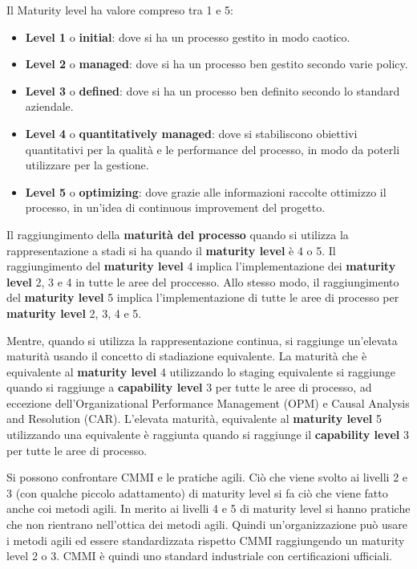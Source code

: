 \begin{enumerate}
            Il Maturity level ha valore compreso tra 1 e 5:
            \begin{itemize}
                  \item \textbf{Level 1} o \textbf{initial}: dove si ha un processo
                        gestito in modo caotico.
                  \item \textbf{Level 2} o \textbf{managed}: dove si ha un processo
                        ben gestito secondo varie policy.
                  \item \textbf{Level 3} o \textbf{defined}: dove si ha un processo
                        ben definito secondo lo standard aziendale.
                  \item \textbf{Level 4} o \textbf{quantitatively managed}: dove
                        si stabiliscono obiettivi quantitativi per la qualità e
                        le performance del processo, in modo da poterli utilizzare
                        per la gestione.
                  \item \textbf{Level 5} o \textbf{optimizing}: dove grazie alle
                        informazioni raccolte ottimizzo il processo, in un'idea di
                        continuous improvement del progetto.
            \end{itemize}
\end{enumerate}
Il raggiungimento della \textbf{maturità del processo} quando si utilizza la rappresentazione a stadi
si ha quando il \textbf{maturity level} è 4 o 5. Il raggiungimento del \textbf{maturity level} 
4 implica l'implementazione dei \textbf{maturity level} 2, 3 e 4 in tutte le aree del proccesso. 
Allo stesso modo, il raggiungimento del \textbf{maturity level} 5 
implica l'implementazione di tutte le aree di processo per \textbf{maturity level} 
2, 3, 4 e 5.

Mentre, quando si utilizza la rappresentazione continua, si raggiunge un'elevata
maturità usando il concetto di stadiazione equivalente. La maturità che è
equivalente al \textbf{maturity level} 4 utilizzando lo staging equivalente
si raggiunge quando si raggiunge a \textbf{capability level} 3 per tutte le aree di
processo, ad eccezione dell'Organizational Performance Management (OPM) e Causal
Analysis and Resolution (CAR). L'elevata maturità, equivalente al 
\textbf{maturity level} 5 utilizzando una equivalente è raggiunta quando si raggiunge 
il \textbf{capability level} 3 per tutte le aree di processo.

Si possono confrontare CMMI e le pratiche agili. Ciò che viene svolto ai livelli
2 e 3 (con qualche piccolo adattamento) di maturity level si fa ciò che viene
fatto anche coi metodi agili. In merito ai livelli 4 e 5 di maturity level si hanno
pratiche che non rientrano nell'ottica dei metodi agili. Quindi un'organizzazione
può usare i metodi agili ed essere standardizzata rispetto CMMI raggiungendo
un maturity level 2 o 3. CMMI è quindi uno standard industriale con certificazioni
ufficiali.